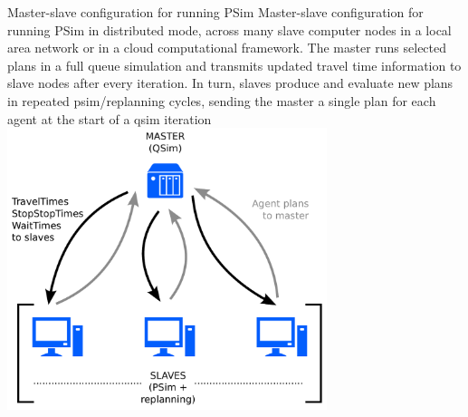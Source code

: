 \createfigure%
{Master-slave configuration for running PSim}%
{Master-slave configuration for running PSim in distributed mode, across many slave computer nodes in a local area network or in a cloud computational framework. The master runs selected plans in a full queue simulation and transmits updated travel time information to slave nodes after every iteration. In turn, slaves produce and evaluate new plans in repeated \gls{psim}/replanning cycles, sending the master a single plan for each agent at the start of a \protect\gls{qsim} iteration}%
{\label{fig:distributedPSim}}%
{\includegraphics[width=0.7\textwidth, angle=0]{extending/figures/PSim/distributed}}%
{}

